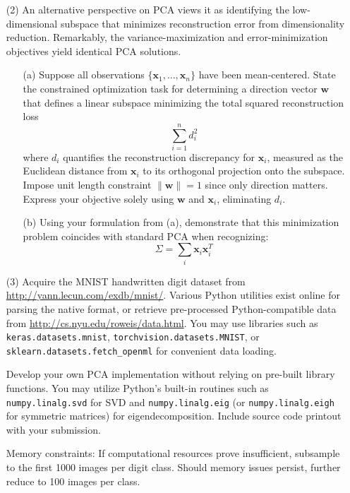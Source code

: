 \documentclass[11pt,addpoints,answers]{exam}
\begin{document}
\begin{enumerate}
		\item[(2)] An alternative perspective on PCA views it as identifying the low-dimensional subspace that minimizes reconstruction error from dimensionality reduction. Remarkably, the variance-maximization and error-minimization objectives yield identical PCA solutions.
		
		\begin{enumerate}
			\item[(a)] Suppose all observations $\{\mathbf{x}_{1}, \dots, \mathbf{x}_{n}\}$ have been mean-centered. State the constrained optimization task for determining a direction vector $\mathbf{w}$ that defines a linear subspace minimizing the total squared reconstruction loss
			\[
			\sum_{i=1}^{n} d_{i}^{2}
			\]
			where $d_{i}$ quantifies the reconstruction discrepancy for $\mathbf{x}_{i}$, measured as the Euclidean distance from $\mathbf{x}_{i}$ to its orthogonal projection onto the subspace. Impose unit length constraint $\|\mathbf{w}\|=1$ since only direction matters. Express your objective solely using $\mathbf{w}$ and $\mathbf{x}_{i}$, eliminating $d_{i}$.
			
			\item[(b)] Using your formulation from (a), demonstrate that this minimization problem coincides with standard PCA when recognizing: 
			\[
			\Sigma = \sum_{i} \mathbf{x}_{i} \mathbf{x}_{i}^{T}
			\]
		\end{enumerate}
		
		
		\item[(3)] Acquire the MNIST handwritten digit dataset from \url{http://yann.lecun.com/exdb/mnist/}. Various Python utilities exist online for parsing the native format, or retrieve pre-processed Python-compatible data from \url{http://cs.nyu.edu/roweis/data.html}. You may use libraries such as \texttt{keras.datasets.mnist}, \texttt{torchvision.datasets.MNIST}, or\\ \texttt{sklearn.datasets.fetch\_openml} for convenient data loading.
		
		Develop your own PCA implementation without relying on pre-built library functions. You may utilize Python's built-in routines such as \texttt{numpy.linalg.svd} for SVD and \texttt{numpy.linalg.eig} (or \texttt{numpy.linalg.eigh} for symmetric matrices) for eigendecomposition. Include source code printout with your submission.
		
		Memory constraints: If computational resources prove insufficient, subsample to the first 1000 images per digit class. Should memory issues persist, further reduce to 100 images per class.
		

\end{enumerate}
\end{document}
